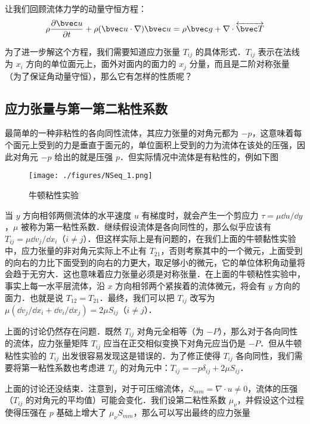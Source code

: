 
让我们回顾流体力学的动量守恒方程：
\begin{equation}
\rho \frac{\partial \bvec u}{\partial t}+\rho(\bvec u\cdot \nabla)\bvec u=\rho \bvec g+\nabla\cdot \overleftrightarrow {\bvec T}
\end{equation}

为了进一步解这个方程，我们需要知道应力张量 $T_{ij}$ 的具体形式．$T_{ij}$ 表示在法线为 $x_i$ 方向的单位面元上，面外对面内的面力的 $x_j$ 分量，而且是二阶对称张量（为了保证角动量守恒），那么它有怎样的性质呢？
\subsection{应力张量与第一第二粘性系数}
最简单的一种非粘性的各向同性流体，其应力张量的对角元都为 $-p$，这意味着每个面元上受到的力是垂直于面元的，单位面积上受到的力为流体在该处的压强，因此对角元 $-p$ 给出的就是压强 $p$．但实际情况中流体是有粘性的，例如下图
\begin{figure}[ht]
\centering
\texttt{[image: ./figures/NSeq\_1.png]}
\caption{牛顿粘性实验} \label{NSeq_fig1}
\end{figure}
当 $y$ 方向相邻两侧流体的水平速度 $u$ 有梯度时，就会产生一个剪应力 $\tau=\mu \dd u/\dd y$，$\mu$ 被称为第一粘性系数．继续假设流体是各向同性的，那么似乎应该有 $T_{ij}=\mu \dd v_j/\dd x_i$（$i\neq j$）．但这样实际上是有问题的，在我们上面的牛顿黏性实验中，应力张量的非对角元实际上不止有 $T_{21}$，否则考察其中的一个微元，上面受到的向右的力比下面受到的向右的力更大，取足够小的微元，它的单位体积角动量将会趋于无穷大．这也意味着应力张量必须是对称张量．在上面的牛顿粘性实验中，事实上每一水平层流体，沿 $x$ 方向相邻两个紧挨着的流体微元，将会有 $y$ 方向的面力．也就是说 $T_{12}=T_{21}$．最终，我们可以把 $T_{ij}$ 改写为 $\mu (\dd v_j/\dd x_i+\dd v_i/\dd x_j)=2\mu S_{ij}$（$i\neq j$）．

上面的讨论仍然存在问题．既然 $T_{ij}$ 对角元全相等（为 $-P$），那么对于各向同性的流体，应力张量矩阵 $T_{ij}$ 应当在正交相似变换下对角元应当仍是 $-P$．但从牛顿粘性实验的 $T_{ij}$ 出发很容易发现这是错误的．为了修正使得 $T_{ij}$ 各向同性，我们需要将第一粘性系数也考虑进 $T_{ij}$ 的对角元中：$T_{ij} = -p\delta_{ij}+2\mu S_{ij}$．

上面的讨论还没结束．注意到，对于可压缩流体，$S_{mm}=\nabla\cdot u\neq 0$，流体的压强（$T_{ij}$ 的对角元的平均值）可能会变化．我们设第二粘性系数 $\mu_\nu$，并假设这个过程使得压强在 $p$ 基础上增大了 $\mu_\nu S_{mm}$，那么可以写出最终的应力张量

